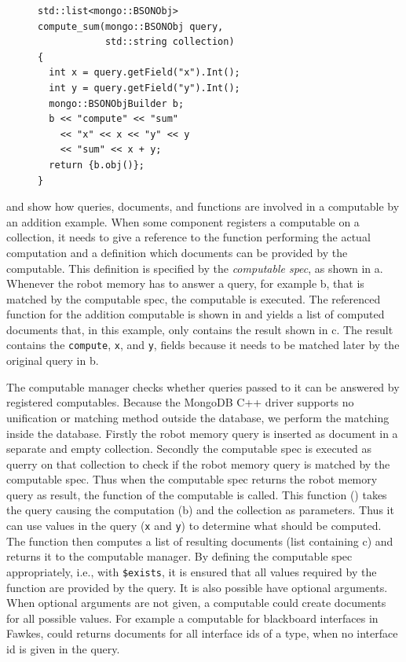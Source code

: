 \begin{figure}
  \vspace{-0.8cm}
\begin{lstlisting}[style=SmallCpp,
  caption={Function of a computable},
  label=lst:comp-func,
  framexleftmargin=5pt, xleftmargin=0pt,
 morekeywords={}, numbers=none]
std::list<mongo::BSONObj>
compute_sum(mongo::BSONObj query,
            std::string collection)
{
  int x = query.getField("x").Int();
  int y = query.getField("y").Int();
  mongo::BSONObjBuilder b;
  b << "compute" << "sum"
    << "x" << x << "y" << y
    << "sum" << x + y;
  return {b.obj()};
}
\end{lstlisting}
\vspace{-8mm}
\end{figure}
 and  show how queries,
documents, and functions are involved in a computable by an addition example.
When some component registers a computable
on a collection, it needs to give a reference to the function
performing the actual computation and a definition which documents can
be provided by the computable. This definition is specified by the
\emph{computable spec}, as shown in a. Whenever the
robot memory has to answer a query, for example b, that is
matched by the computable spec, the computable is executed. The
referenced function for the addition computable is shown in
 and yields a list of computed documents that,
in this example, only contains the result shown in
c. The result contains the \texttt{compute},
\texttt{x}, and \texttt{y}, fields because it needs to be matched
later by the original query in b.

The computable manager checks whether queries passed to it can be
answered by registered computables. Because the MongoDB C++ driver
supports no unification or matching method outside the database, we
perform the matching inside the database. Firstly the robot memory query is inserted
as document in a separate and empty collection. Secondly the
computable spec is executed as querry on that collection to check if the robot memory query
is matched by the computable spec. Thus when the computable spec
returns the robot memory query as result, the function of the computable is called. This function
() takes the query causing the computation
(b) and the collection as parameters. Thus it can use
values in the query (\texttt{x} and \texttt{y}) to determine what
should be computed. The function then computes a list of resulting
documents (list containing c) and returns it to the
computable manager. By defining the computable spec appropriately,
i.e., with \texttt{\$exists}, it is ensured that all values required
by the function are provided by the query. It is also possible have
optional arguments. When optional arguments are not given, a
computable could create documents for all possible values. For example a computable for
blackboard interfaces in Fawkes, could returns documents for all interface
ids of a type, when no interface id is given in the query.

